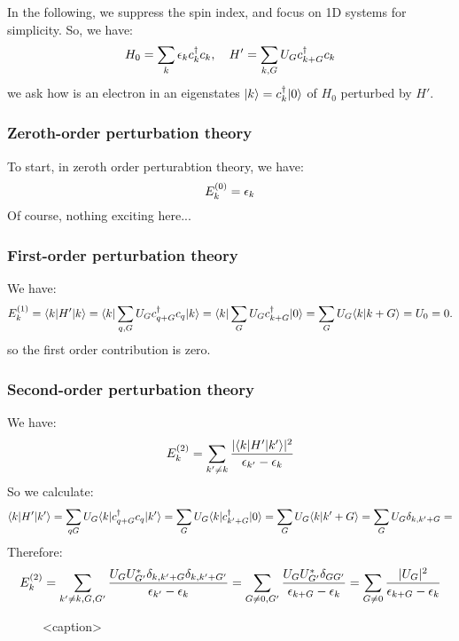 In the following, we suppress the spin index, and focus on 1D systems for simplicity. So, we have:
\begin{align*}
    H_0 = \sum_k \epsilon_k c^\dagger_k c_k, \quad H' = \sum_{k, G} U_G c^\dagger_{k + G}c_k
\end{align*}
we ask how is an electron in an eigenstates $\lvert k \rangle = c^\dagger_k \lvert 0 \rangle$ of $H_0$ perturbed by $H'$.

\subsubsection{Zeroth-order perturbation theory}
To start, in zeroth order perturabtion theory, we have:
\begin{equation}
    E_k^{(0)} = \epsilon_k
\end{equation}
Of course, nothing exciting here...

\subsubsection{First-order perturbation theory}
We have:
\begin{equation}
    E_k^{(1)} = \langle k \rvert H'\lvert k \rangle = \langle k \rvert\sum_{q,G} U_G c^\dagger_{q + G}c_q\lvert k \rangle = \langle k \rvert\sum_G U_G c_{k+G}^\dagger \lvert 0 \rangle = \sum_G U_G\langle k \lvert k+G \rangle = U_0 = 0.
\end{equation}
so the first order contribution is zero.

\subsubsection{Second-order perturbation theory}
We have:
\begin{equation}
    E_k^{(2)} = \sum_{k' \neq k} \frac{\lvert \langle k \rvert H'\lvert k' \rangle \rvert^2}{\epsilon_{k'} - \epsilon_k}
\end{equation}
So we calculate:
\begin{equation}
    \langle k \rvert H'\lvert k' \rangle = \sum_{qG}U_G\langle k \rvert c^\dagger_{q + G}c_q \lvert k' \rangle = \sum_G U_G\langle k \rvert c^\dagger_{k'+G}\lvert 0 \rangle = \sum_G U_G\langle k \lvert k'+G \rangle = \sum_G U_G \delta_{k, k'+G} = 
\end{equation}
Therefore:
\begin{equation}
    E_k^{(2)} = \sum_{k' \neq k, G, G'}\frac{U_G U_{G'}^* \delta_{k,k'+G}\delta_{k, k'+G'}}{\epsilon_{k'} - \epsilon_k} = \sum_{G \neq 0,G'} \frac{U_G U_{G'}^* \delta_{GG'}}{\epsilon_{k+G} - \epsilon_k} = \sum_{G \neq 0} \frac{\lvert U_G \rvert^2}{\epsilon_{k+G} - \epsilon_k}
\end{equation}

\begin{figure}[htbp]
    \centering
    
    \caption{<caption>}
    \label{<label>}
\end{figure}

